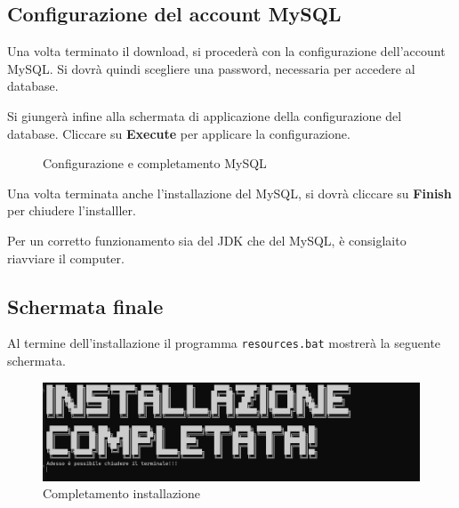 \subsection{Configurazione del account MySQL}
Una volta terminato il download, si procederà con la configurazione dell'account MySQL. Si dovrà quindi scegliere una password, necessaria per accedere al database. 

Si giungerà infine alla schermata di applicazione della configurazione del database. Cliccare su \textbf{Execute} per applicare la configurazione.
\begin{figure}[h!]
    \centering
    \hfill
    \caption{Configurazione e completamento MySQL}
\end{figure}

Una volta terminata anche l'installazione del MySQL, si dovrà cliccare su \textbf{Finish} per chiudere l'installler. 

\begin{tcolorbox}[  colback=white!5!white, colframe=gray, title={Avvertenza} ]
    Per un corretto funzionamento sia del JDK che del MySQL, è consiglaito riavviare il computer.
    
\end{tcolorbox}


\subsection{Schermata finale}
Al termine dell'installazione il programma \texttt{resources.bat} mostrerà la seguente schermata. 

\begin{figure}[h!]
    \centering
    \includegraphics[width=.6\textwidth]{images/insytllazione compeltata.png}
    \caption{Completamento installazione}
\end{figure}